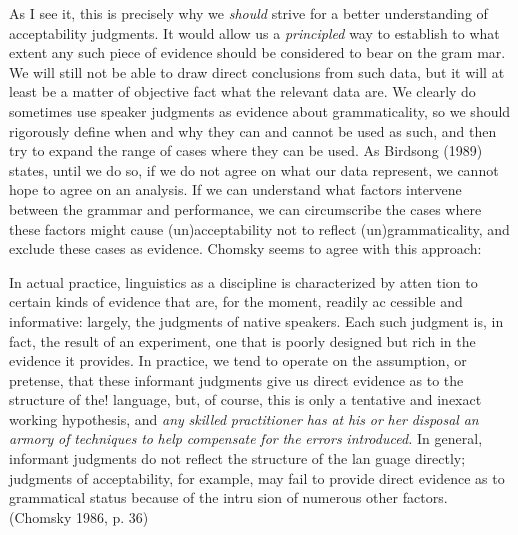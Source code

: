 \begin{styleTextbody}
As I see it, this is precisely why we \textit{should}\textit{ }strive for a better understanding of acceptability judgments. It would allow us a \textit{principled}\textit{ }way to establish to what extent any such piece of evidence should be considered to bear on the gram\- mar. We will still not be able to draw direct conclusions from such data, but it will at least be a matter of objective fact what the relevant data are. We clearly do sometimes use speaker judgments as evidence about grammaticality, so we should rigorously define when and why they can and cannot be used as such, and then try to expand the range of cases where they can be used. As Birdsong (1989) states, until we do so, if we do not agree on what our data represent, we cannot hope to agree on an analysis. If we can understand what factors intervene between the grammar and performance, we can circumscribe the cases where these factors might cause (un)acceptability not to reflect (un)grammaticality, and exclude these cases as evidence. Chomsky seems to agree with this approach:
\end{styleTextbody}


\begin{styleTextbody}
In actual practice, linguistics as a discipline is characterized by atten\- tion to certain kinds of evidence that are, for the moment, readily ac\- cessible and informative: largely, the judgments of native speakers. Each such judgment is, in fact, the result of an experiment, one that is poorly designed but rich in the evidence it provides. In practice, we tend to operate on the assumption, or pretense, that these informant judgments give us {\textquotedbl}direct evidence{\textquotedbl} as to the structure of the!\- language, but, of course, this is only a tentative and inexact working hypothesis, and \textit{any}\textit{ }\textit{skilled}\textit{ }\textit{practitioner}\textit{ }\textit{has}\textit{ }\textit{at}\textit{ }\textit{his}\textit{ }\textit{or}\textit{ }\textit{her}\textit{ }\textit{disposal}\textit{ }\textit{an}\textit{ }\textit{armory}\textit{ }\textit{of}\textit{ }\textit{techniques}\textit{ }\textit{to}\textit{ }\textit{help}\textit{ }\textit{compensate}\textit{ }\textit{for}\textit{ }\textit{the}\textit{ }\textit{errors}\textit{ }\textit{introduced.}\textit{ }In general, informant judgments do not reflect the structure of the lan\- guage directly; judgments of acceptability, for example, may fail to provide direct evidence as to grammatical status because of the intru\- sion of numerous other factors. (Chomsky 1986, p. 36)
\end{styleTextbody}


